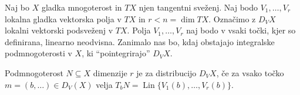 
Naj bo $X$ gladka mnogoterost in $TX$ njen tangentni sveženj.
Naj bodo $V_1, \ldots, V_r$ lokalna gladka vektorska polja v $TX$ in $r < n =
\dim TX$.
Označimo z $D_V X$ lokalni vektorski podsveženj v $TX$.
Polja $V_1, \ldots, V_r$ naj bodo v vsaki točki, kjer so definirana, linearno
neodvisna.
Zanimalo nas bo, kdaj obstajajo integralske podmnogoterosti v $X$, ki
\enquote{pointegrirajo} $D_V X$.

\begin{definicija}
  Podmnogoterost $N \subseteq X$ dimenzije $r$ je  za distribucijo $D_V X$, če za vsako točko $m = (b, \ldots)
  \in D_V(X)$ velja $T_b N = \operatorname{Lin} \{ V_1(b), \ldots, V_r(b) \}$.
\end{definicija}

